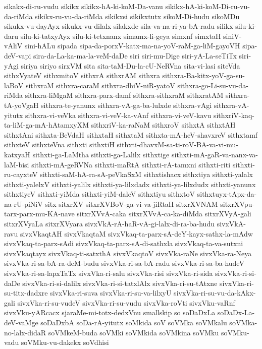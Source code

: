 {sikakx-di-ru-vudu
sikikx
sikikx-hA-ki-koM-Da-vanu
sikikx-hA-ki-koM-Di-ru-vu-da-riMda
sikikx-ru-vu-da-riMda
sikikxsi
sikikxtutx
sikoM-Di-hudu
sikoMDu
sikukx-vu-dayAyx
sikukx-vu-dilalx
silakxde
sila-va-na-ri-ya-bA-radu
silikx
silu-ki-daru
silu-ki-tatxyAyx
silu-ki-tetxnanx
simamx-li-geya
simxnf
simxtaH
siniV-vAliV
sini-hALu
sipada
sipa-da-porxV-katx-ma-na-yoV-raM-ga-liM-gayoVH
sipa-deV-vapi
sira-da-La-ka-ma-la-veM-daDe
siri
siri-mu-Dige
siri-yA-La-seTiTx
siri-yAgi
siriya
siriyo
sirxVM
sita
sita-taM-Du-la-cU-NeRVna
sita-vi-lasi
siteVda
sithxVyateV
sithxmitoV
sithxrA
sithxrAM
sithxra
sithxra-Ba-kitx-yoV-ga-su-laBoV
sithxraM
sithxra-caraM
sithxra-dhiV-niR-yatoV
sithxra-go-Li-su-vu-da-riMda
sithxra-liMgaM
sithxra-parx-damf
sithxra-sithxraM
sithxratAM
sithxra-tA-yoVgaH
sithxra-te-yanunx
sithxra-vA-ga-ba-lulxde
sithxra-vAgi
sithxra-vA-yitutx
sithxra-vi-veVka
sithxra-vi-veV-ka-vAnf
sithxra-vi-veV-kavu
sithxriV-kaq-ta-liM-ga-mA-hAtamxyXM
sithxriV-ka-raNaM
sithxroV
sithxtA
sithxtAH
sithxtAni
sithxta-BeVdaH
sithxtaH
sithxtaM
sithxta-mA-heV-shavxreV
sithxtamf
sithxteV
sithxteVna
sithxti
sithxtiH
sithxti-dhavxM-sa-ti-roV-BA-va-vi-mu-katxyaH
sithxti-ga-LaMtha
sithxti-ga-Lalilx
sithxtige
sithxti-mA-gaR-va-nanx-va-laM-bisi
sithxti-mA-geRVNa
sithxti-maRtA
sithxti-rA-tamxni
sithxti-riti
sithxti-ru-cayxteV
sithxti-saM-hA-ra-sA-peVkaSxM
sithxtishacx
sithxtiya
sithxti-yalalx
sithxti-yalelxV
sithxti-yalilx
sithxti-ya-lilxdadx
sithxti-ya-lilxdudx
sithxti-yanunx
sithxtiyeV
sithxti-yiMda
sithxti-yiM-daleV
sithxtiyu
sithxtoV
sithxtuyx-tApx-da-na-rU-piNiV
sitx
sitxrXV
sitxrXVBoV-ga-vi-va-jiRtaH
sitxrXVNAM
sitxrXVpu-tarx-parx-mu-KA-nave
sitxrXVvA-caka
sitxrXVvA-ca-ka-diMda
sitxrXVyA-gali
sitxrXVyaLa
sitxrXVyara
sivxVkA-rA-haR-vA-gi-lalx-di-ra-ba-hudu
sivxVkA-ravu
sivxVkaqtAH
sivxVkaqtaM
sivxVkaq-ta-parx-sA-deY-kayx-sathx-la-mAdw
sivxVkaq-ta-parx-sAdi
sivxVkaq-ta-parx-sA-di-sathxla
sivxVkaq-ta-va-sutxni
sivxVkaqtayx
sivxVkaq-ti-satxthA
sivxVkaqtoV
sivxVka-raNe
sivxVka-ra-Neya
sivxVka-ri-sa-bA-ra-deM-budu
sivxVka-ri-sa-bA-radu
sivxVka-ri-sa-ba-hudeV
sivxVka-ri-sa-lapxTaTx
sivxVka-ri-salu
sivxVka-risi
sivxVka-ri-sida
sivxVka-ri-si-daDe
sivxVka-ri-si-dalilx
sivxVka-ri-si-tatxlAlx
sivxVka-ri-su-tAtxne
sivxVka-ri-su-titx-dadxre
sivxVka-ri-suva
sivxVka-ri-su-va-lilxyU
sivxVka-ri-su-vu-da-kAkx-gali
sivxVka-ri-su-vudeV
sivxVka-ri-su-vudu
sivxVka-roVti
sivxVku-vaRnf
sivxVku-yARcacx
sjaraMe-mi-totx-dedxVnu
smallskip
so
soDaDxLa
soDaDx-La-deV-vaMge
soDaDxbA
soDa-rA-yitutx
soMkida
soV
soVMka
soVMkalu
soVMka-no-lalx-didaR
soVMkeM-buda
soVMki
soVMkida
soVMkina
soVMku
soVMku-vadu
soVMku-vu-dakekx
soVdhisi
}
